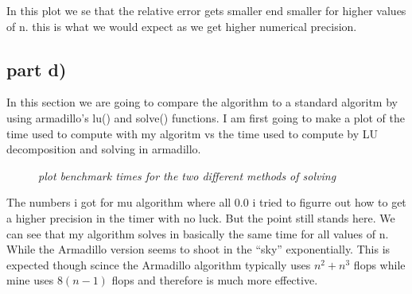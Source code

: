 \documentclass[norsk,a4paper,12pt]{article}
\begin{document}
In this plot we se that the relative error gets smaller end smaller for higher values of n. this is what we would expect as we
get higher numerical precision. 

\subsection*{part d)}

In this section we are going to compare the algorithm to a standard algoritm by using armadillo's lu() and solve() functions.
I am first going to make a plot of the time used to compute with my algoritm vs the time used to compute by LU decomposition
and solving in armadillo.

\begin{figure}[H]
  \begin{center}
  \end{center}
  \caption{\textit{plot benchmark times for the two different methods of solving}}
  \label{fig:edge}
\end{figure}

The numbers i got for mu algorithm where all $0.0$ i tried to figurre out how to get a higher precision in the timer with no luck.
But the point still stands here. We can see that my algorithm solves in basically the same time for all values of n. 
While the Armadillo version seems to shoot in the ``sky'' exponentially. This is expected though scince the Armadillo algorithm
typically uses $n^2 + n^3$ flops while mine uses $8(n-1)$ flops and therefore is much more effective.
 
\end{document}
